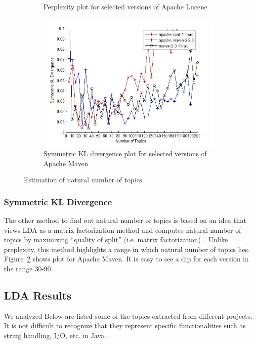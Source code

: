 \documentclass[12pt]{article}
\begin{document}
\begin{figure}
\begin{subfigure}[b]{0.5\textwidth}
                \caption{Perplexity plot for selected versions of Apache Lucene}
                \label{ppx2}
        \end{subfigure}
        \begin{subfigure}[b]{\textwidth}
                \centering
                \includegraphics[width=\textwidth]{KL-divergence-maven.jpg}
                \caption{Symmetric KL divergence plot for selected versions of Apache Maven}
                \label{ppx3}
        \end{subfigure}
        \caption{Estimation of natural number of topics}\label{fig:numtopics}
\end{figure}

\subsubsection{Symmetric KL Divergence} \label{Symmetric KL Divergence}
The other method to find out natural number of topics is based on an idea that views LDA as a matrix factorization method and computes natural number of topics by maximizing ``quality of split'' (i.e. matrix factorization)~\cite{arun2010finding}. Unlike preplexity, this method highlights a range in which natural number of topics lies. Figure~\ref{ppx3} shows plot for Apache Maven. It is easy to see a dip for each version in the range 30-90.

\subsection{LDA Results} \label{LDA Results}
We analyzed 
Below are listed some of the topics extracted from different projects. It is not difficult to recognize that they represent specific functionalities such as string handling, I/O, etc. in Java.
\end{document}
